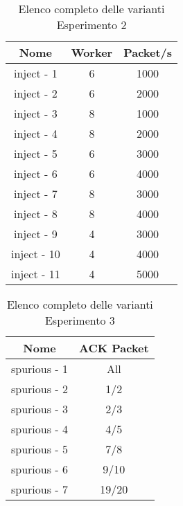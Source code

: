\begin{table}[h!]
    \centering
    \caption*{Elenco completo delle varianti Esperimento 2}
    \begin{tabular}{|c|c|c|}
        \hline
        \textbf{Nome} & \textbf{Worker} & \textbf{Packet/s} \\
        \hline
        inject - 1 & 6 & 1000 \\
        \hline
        inject - 2 & 6 & 2000 \\
        \hline
        inject - 3 & 8 & 1000 \\
        \hline
        inject - 4 & 8 & 2000 \\
        \hline
        inject - 5 & 6 & 3000 \\
        \hline
        inject - 6 & 6 & 4000 \\
        \hline
        inject - 7 & 8 & 3000 \\
        \hline
        inject - 8 & 8 & 4000 \\
        \hline
        inject - 9 & 4 & 3000 \\
        \hline
        inject - 10 & 4 & 4000 \\
        \hline
        inject - 11 & 4 & 5000 \\
        \hline
    \end{tabular}
\end{table}

\begin{table}[h!]
    \centering
    \caption*{Elenco completo delle varianti Esperimento 3}
    \begin{tabular}{|c|c|}
        \hline
        \textbf{Nome} & \textbf{ACK Packet} \\
        \hline
        spurious - 1  & All \\
        \hline
        spurious - 2 & 1/2 \\
        \hline
        spurious - 3 & 2/3 \\
        \hline
        spurious - 4 & 4/5 \\
        \hline
        spurious - 5 & 7/8 \\
        \hline
        spurious - 6 & 9/10 \\
        \hline
        spurious - 7 & 19/20 \\
        \hline
    \end{tabular}
\end{table}